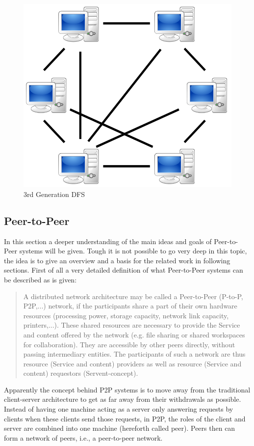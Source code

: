 	\begin{figure}[H]
		\begin{center}
		\includegraphics[scale=0.25]{Talk5/3rd_gen_dfs.PNG}
		\end{center}
		\caption{3rd Generation DFS \cite{wikimedia:p2p}}
		\label{3rd_gen_dfs}
	\end{figure}

\subsection{Peer-to-Peer}
In this section a deeper understanding of the main ideas and goals of Peer-to-Peer systems will be given. Tough it is not possible to go very deep in this topic, the idea is to give an overview and a basis for the related work in following sections. First of all a very detailed definition of what Peer-to-Peer systems can be described as is given:
\begin{quote}
A distributed network architecture may be called a Peer-to-Peer (P-to-P, P2P,...) network, if the participants share a part of their own hardware resources (processing power, storage capacity, network link capacity, printers,...). These shared resources are necessary to provide the Service and content offered by the network (e.g. file sharing or shared workspaces for collaboration). They are accessible by other peers directly, without passing intermediary entities. The participants of such a network are thus resource (Service and content) providers as well as resource (Service and content) requestors (Servent-concept)\cite{ptp:definition}.
\end{quote}
Apparently the concept behind P2P systems is to move away from the traditional client-server architecture to get as far away from their withdrawals as possible. Instead of having one machine acting as a server only answering requests by clients when these clients send those requests, in P2P, the roles of the client and server are combined into one machine (hereforth called peer). Peers then can form a network of peers, i.e., a peer-to-peer network.

